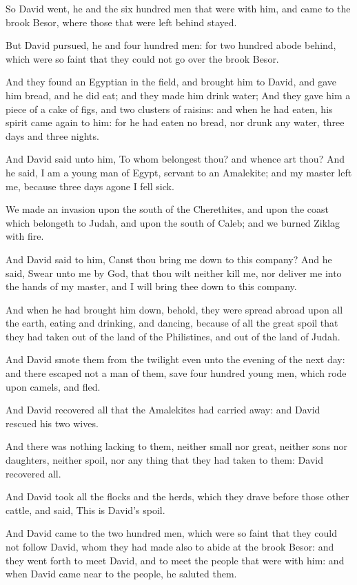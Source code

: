 \Verse So David went, he and the six hundred men that were with him, and came to the brook Besor, where those that were left behind stayed.

\Verse But David pursued, he and four hundred men: for two hundred abode behind, which were so faint that they could not go over the brook Besor.

\Verse And they found an Egyptian in the field, and brought him to David, and gave him bread, and he did eat; and they made him drink water; \Verse And they gave him a piece of a cake of figs, and two clusters of raisins: and when he had eaten, his spirit came again to him: for he had eaten no bread, nor drunk any water, three days and three nights.

\Verse And David said unto him, To whom belongest thou? and whence art thou? And he said, I am a young man of Egypt, servant to an Amalekite; and my master left me, because three days agone I fell sick.

\Verse We made an invasion upon the south of the Cherethites, and upon the coast which belongeth to Judah, and upon the south of Caleb; and we burned Ziklag with fire.

\Verse And David said to him, Canst thou bring me down to this company?  And he said, Swear unto me by God, that thou wilt neither kill me, nor deliver me into the hands of my master, and I will bring thee down to this company.

\Verse And when he had brought him down, behold, they were spread abroad upon all the earth, eating and drinking, and dancing, because of all the great spoil that they had taken out of the land of the Philistines, and out of the land of Judah.

\Verse And David smote them from the twilight even unto the evening of the next day: and there escaped not a man of them, save four hundred young men, which rode upon camels, and fled.

\Verse And David recovered all that the Amalekites had carried away: and David rescued his two wives.

\Verse And there was nothing lacking to them, neither small nor great, neither sons nor daughters, neither spoil, nor any thing that they had taken to them: David recovered all.

\Verse And David took all the flocks and the herds, which they drave before those other cattle, and said, This is David's spoil.

\Verse And David came to the two hundred men, which were so faint that they could not follow David, whom they had made also to abide at the brook Besor: and they went forth to meet David, and to meet the people that were with him: and when David came near to the people, he saluted them.

